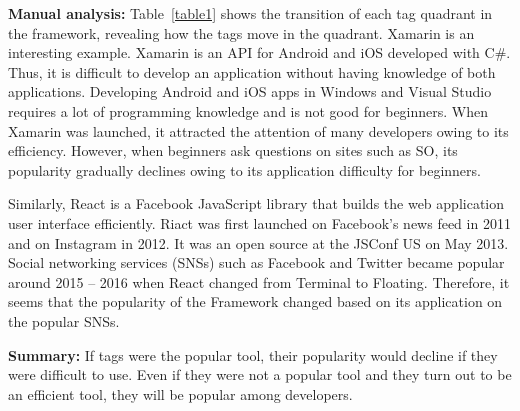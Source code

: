 \documentclass[english,preprint,JIP,technote]{ipsj}
\begin{document}
\noindent \textbf{Manual analysis:}
Table~\ref{table1} shows the transition of each tag quadrant in the framework, revealing how the tags move in the quadrant. Xamarin is an interesting example. Xamarin\cite{reynolds2014xamarin} is an API for Android and iOS developed with C\#. Thus, it is difficult to develop an application without having knowledge of both applications. Developing Android and iOS apps in Windows and Visual Studio requires a lot of programming knowledge and is not good for beginners. When Xamarin was launched, it attracted the attention of many developers owing to its efficiency. However, when beginners ask questions on sites such as SO, its popularity gradually declines owing to its application difficulty for beginners.

Similarly, React\cite{staff2016react} is a Facebook JavaScript library that builds the web application user interface efficiently. Riact was first launched on Facebook’s news feed in 2011 and on Instagram in 2012. It was an open source at the JSConf US on May 2013. Social networking services (SNSs)\cite{ellison2013sociality} such as Facebook and Twitter became popular around 2015 – 2016 when React changed from Terminal to Floating. Therefore, it seems that the popularity of the Framework changed based on its application on the popular SNSs.


\noindent \textbf{Summary:}
If tags were the popular tool, their popularity would decline if they were difficult to use. Even if they were not a popular tool and they turn out to be an efficient tool, they will be popular among developers.


\end{document}
